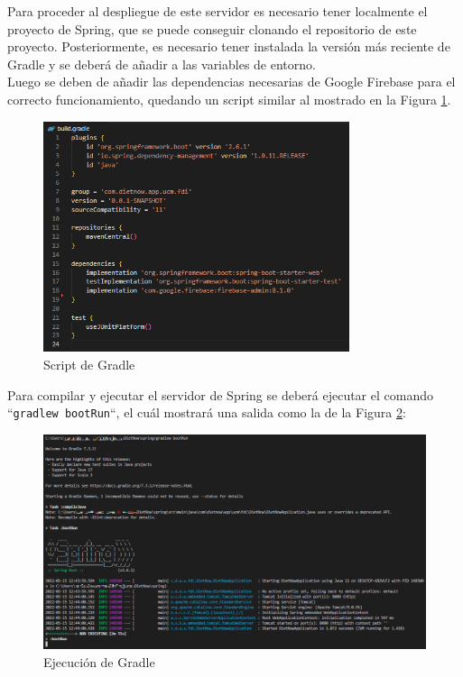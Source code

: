 Para proceder al despliegue de este servidor es necesario tener localmente el proyecto de Spring, que se puede conseguir clonando el repositorio de este proyecto. Posteriormente, es necesario tener instalada la versión más reciente de Gradle y se deberá de añadir a las variables de entorno.\\
Luego se deben de añadir las dependencias necesarias de Google Firebase para el correcto funcionamiento, quedando un script similar al mostrado en la Figura \ref{fig:gradle_script}.

\begin{figure}[H]
    \centering
    \includegraphics[width=0.8\textwidth]{Images/Annexes/gradle.png}
    \caption{Script de Gradle}
    \label{fig:gradle_script}
\end{figure}

Para compilar y ejecutar el servidor de Spring se deberá ejecutar el comando ``\texttt{gradlew bootRun}``, el cuál mostrará una salida como la de la Figura \ref{fig:gradle}:
\begin{figure}[H]
    \centering
    \includegraphics[width=\textwidth]{Images/Annexes/gradle_commandline.png}
    \caption{Ejecución de Gradle}
    \label{fig:gradle}
\end{figure}



